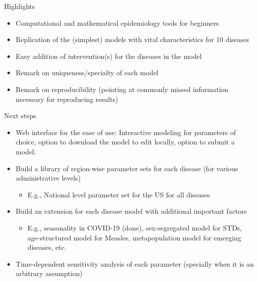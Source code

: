 \documentclass{beamer}
\begin{document}
\begin{frame}{Highlights}

\begin{itemize}
\item Computational and mathematical epidemiology tools for beginners
\item Replication of the (simplest) models with vital characteristics for 10 diseases
\item Easy addition of intervention(s) for the diseases in the model
\item Remark on uniqueness/specialty of each model
\item Remark on reproducibility (pointing at commonly missed information necessary for reproducing results)
\end{itemize}



\end{frame}



\begin{frame}{Next steps}

\begin{itemize}
    \item Web interface for the ease of use: Interactive modeling for parameters of choice, option to download the model to edit locally, option to submit a model.
\item  Build a library of region-wise parameter sets for each disease (for various administrative levels)
\begin{itemize}
    \item E.g., National level parameter set for the US for all diseases
\end{itemize}
\item  Build an extension for each disease model with additional important factors
\begin{itemize}
    \item E.g., seasonality in COVID-19 (done), sex-segregated model for STDs, age-structured model for  Measles, metapopulation model for emerging diseases, etc.
\end{itemize}
\item  Time-dependent sensitivity analysis of each parameter (specially when it is an arbitrary assumption)

\end{itemize}

\end{frame}
\end{document}
